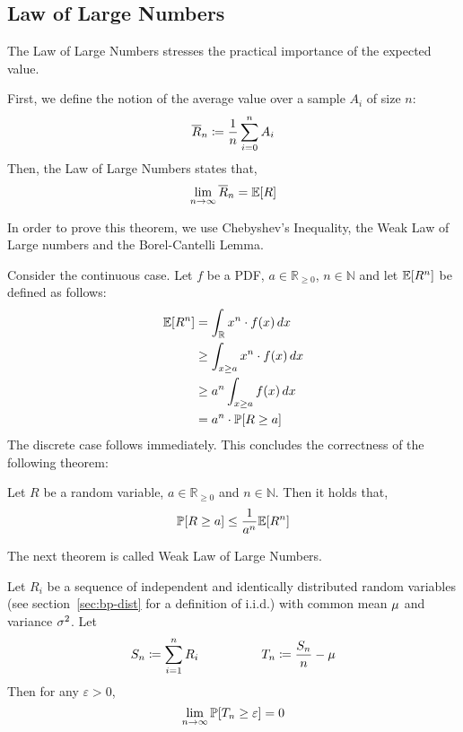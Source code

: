 \subsection{Law of Large Numbers}
\label{sec:bp-lln}
%
The Law of Large Numbers stresses the practical importance of the expected value.
\begin{theorem}
  First, we define the notion of the average value over a sample $A_i$ of size $n$:
  \[ \overline{R}_n \coloneqq \frac1n \sum_{i=0}^n A_i \]
  Then, the Law of Large Numbers states that,
  \[ \lim_{n\to\infty} \overline{R}_n = \mathbb E[R] \]
\end{theorem}

In order to prove this theorem, we use Chebyshev's Inequality, the Weak Law of Large numbers
and the Borel-Cantelli Lemma.

Consider the continuous case. Let $f$ be a PDF, $a \in \mathbb R_{\geq 0}$, $n \in \mathbb N$ and let $\mathbb E[R^n]$ be defined as follows:
\begin{align*}
  \mathbb E[R^n] &= \int_{\mathbb R} x^n \cdot f(x) \, dx \\
          &\geq \int_{x \geq a} x^n \cdot f(x) \, dx \\
          &\geq a^n \int_{x \geq a} f(x) \, dx \\
          &= a^n \cdot \mathbb P[R \geq a]
\end{align*}
The discrete case follows immediately.
This concludes the correctness of the following theorem:
\begin{theorem}
  Let $R$ be a random variable, $a \in \mathbb R_{\geq 0}$ and $n \in \mathbb N$. Then it holds that,
  \[ \mathbb P[R \geq a] \leq \frac{1}{a^n} \mathbb E[R^n] \]
\end{theorem}

The next theorem is called Weak Law of Large Numbers.
\begin{theorem}
  Let $R_i$ be a sequence of independent and identically distributed random variables
  (see section~\ref{sec:bp-dist} for a definition of i.i.d.)
  with common mean $\mu$ and variance $\sigma^2$. Let
  \[
      S_n \coloneqq \sum_{i=1}^n R_i \hspace{50pt}
      T_n \coloneqq \frac{S_n}{n} - \mu
  \]
  Then for any $\varepsilon > 0$,
  \[ \lim_{n\to\infty} \mathbb P[T_n \geq \varepsilon] = 0 \]
\end{theorem}

